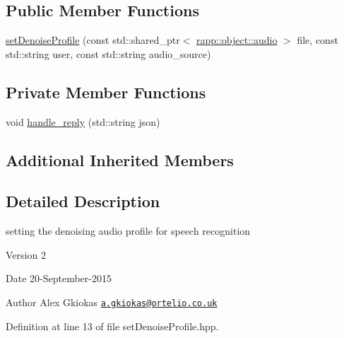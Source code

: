 \subsection*{Public Member Functions}
\begin{DoxyCompactItemize}
\item 
\hyperlink{classrapp_1_1cloud_1_1setDenoiseProfile_a2a4b101d2ff4b203cfc847b3cc69c50e}{set\-Denoise\-Profile} (const std\-::shared\-\_\-ptr$<$ \hyperlink{classrapp_1_1object_1_1audio}{rapp\-::object\-::audio} $>$ file, const std\-::string user, const std\-::string audio\-\_\-source)
\end{DoxyCompactItemize}
\subsection*{Private Member Functions}
\begin{DoxyCompactItemize}
\item 
void \hyperlink{classrapp_1_1cloud_1_1setDenoiseProfile_af30fee56946fd59af9bccce83a60d32a}{handle\-\_\-reply} (std\-::string json)
\end{DoxyCompactItemize}
\subsection*{Additional Inherited Members}


\subsection{Detailed Description}
setting the denoising audio profile for speech recognition 

\begin{DoxyVersion}{Version}
2 
\end{DoxyVersion}
\begin{DoxyDate}{Date}
20-\/\-September-\/2015 
\end{DoxyDate}
\begin{DoxyAuthor}{Author}
Alex Gkiokas \href{mailto:a.gkiokas@ortelio.co.uk}{\tt a.\-gkiokas@ortelio.\-co.\-uk} 
\end{DoxyAuthor}


Definition at line 13 of file set\-Denoise\-Profile.\-hpp.



